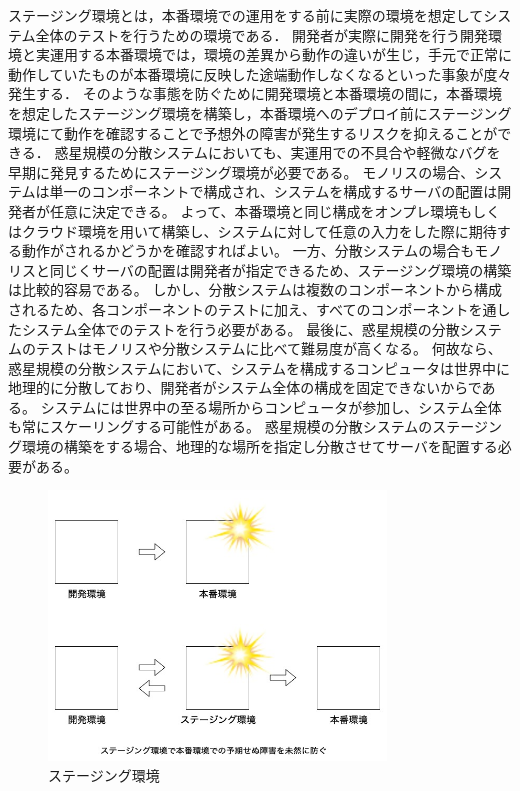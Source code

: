 ステージング環境とは，本番環境での運用をする前に実際の環境を想定してシステム全体のテストを行うための環境である．
開発者が実際に開発を行う開発環境と実運用する本番環境では，環境の差異から動作の違いが生じ，手元で正常に動作していたものが本番環境に反映した途端動作しなくなるといった事象が度々発生する．
そのような事態を防ぐために開発環境と本番環境の間に，本番環境を想定したステージング環境を構築し，本番環境へのデプロイ前にステージング環境にて動作を確認することで予想外の障害が発生するリスクを抑えることができる．
惑星規模の分散システムにおいても、実運用での不具合や軽微なバグを早期に発見するためにステージング環境が必要である。
モノリスの場合、システムは単一のコンポーネントで構成され、システムを構成するサーバの配置は開発者が任意に決定できる。
よって、本番環境と同じ構成をオンプレ環境もしくはクラウド環境を用いて構築し、システムに対して任意の入力をした際に期待する動作がされるかどうかを確認すればよい。
一方、分散システムの場合もモノリスと同じくサーバの配置は開発者が指定できるため、ステージング環境の構築は比較的容易である。
しかし、分散システムは複数のコンポーネントから構成されるため、各コンポーネントのテストに加え、すべてのコンポーネントを通したシステム全体でのテストを行う必要がある。
最後に、惑星規模の分散システムのテストはモノリスや分散システムに比べて難易度が高くなる。
何故なら、惑星規模の分散システムにおいて、システムを構成するコンピュータは世界中に地理的に分散しており、開発者がシステム全体の構成を固定できないからである。
システムには世界中の至る場所からコンピュータが参加し、システム全体も常にスケーリングする可能性がある。
惑星規模の分散システムのステージング環境の構築をする場合、地理的な場所を指定し分散させてサーバを配置する必要がある。


\begin{figure}[htbp]
  \begin{center}
    \includegraphics[width=0.8\textwidth]{./figures/staging.jpg}
    \caption{ステージング環境}
  \end{center}
\end{figure}

